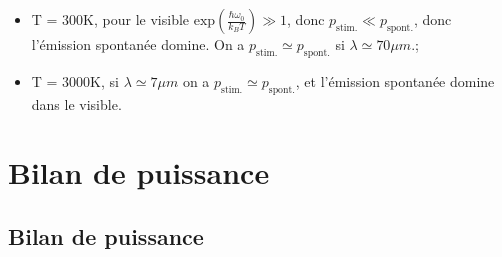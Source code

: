 \documentclass[11pt,a4paper]{report}
\begin{document}
\begin{itemize}
	\item T = 300K, pour le visible $\text{exp}\left(\frac{\hbar\omega_0}{k_B T}\right) \gg 1$, 
	donc $p_\text{stim.} \ll p_\text{spont.}$, donc l'émission spontanée domine. On a 
	$p_\text{stim.} \simeq p_\text{spont.}$ si $\lambda \simeq 70 \mu m$.;
	\item T = 3000K, si $\lambda \simeq 7 \mu m$ on a $p_\text{stim.} \simeq p_\text{spont.}$, et
	l'émission spontanée domine dans le visible.
\end{itemize}

\newpage
\section{Bilan de puissance}

\subsection{Bilan de puissance}
\end{document}
